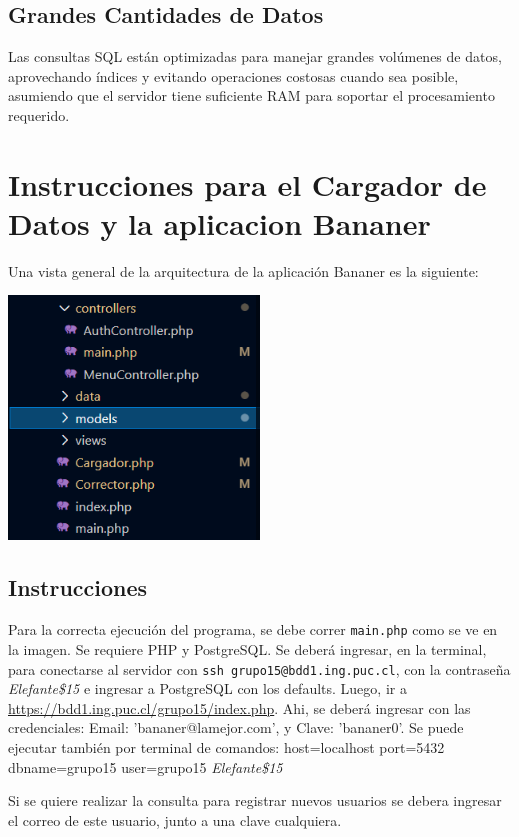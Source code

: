 \documentclass[12pt]{article}
\begin{document}
\subsection*{Grandes Cantidades de Datos}
Las consultas SQL están optimizadas para manejar grandes volúmenes de datos, aprovechando índices y evitando operaciones costosas cuando sea posible, asumiendo que el servidor tiene suficiente RAM para soportar el procesamiento requerido.


\section*{Instrucciones para el Cargador de Datos y la aplicacion Bananer}

Una vista general de la arquitectura de la aplicación Bananer es la siguiente:


\begin{center}
\includegraphics[width=0.5\textwidth]{img/arquitectura.png}
\end{center}

\subsection*{Instrucciones}
Para la correcta ejecución del programa, se debe correr \texttt{main.php} como se ve en la imagen. Se requiere PHP y PostgreSQL. Se deberá ingresar, en la terminal, para conectarse al servidor con \texttt{ssh grupo15@bdd1.ing.puc.cl}, con la contraseña \textit{Elefante\$15} e ingresar a PostgreSQL con los defaults. Luego, ir a \url{https://bdd1.ing.puc.cl/grupo15/index.php}.
Ahi, se deberá ingresar con las credenciales: Email: 'bananer@lamejor.com', y Clave: 'bananer0'. Se puede ejecutar también por terminal de comandos: host=localhost port=5432 dbname=grupo15 user=grupo15 \textit{Elefante\$15}

Si se quiere realizar la consulta para registrar nuevos usuarios se debera ingresar el correo de este usuario, junto a una clave cualquiera. 

\end{document}
